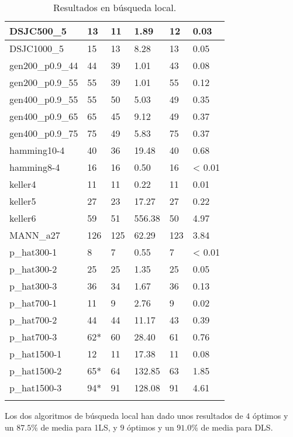 \begin{small}
\begin{longtable}{l l l l l l}
    DSJC500\_5         & 13 & 11 & 1.89 & 12 & 0.03   \\ \hline
    DSJC1000\_5        & 15 & 13 & 8.28 & 13 & 0.05   \\ \hline
    gen200\_p0.9\_44   & 44 & 39 & 1.01 & 43 & 0.08   \\ \hline
    gen200\_p0.9\_55   & 55 & 39 & 1.01 & 55 & 0.12   \\ \hline
    gen400\_p0.9\_55   & 55 & 50 & 5.03 & 49 & 0.35   \\ \hline
    gen400\_p0.9\_65   & 65 & 45 & 9.12 & 49 & 0.37   \\ \hline
    gen400\_p0.9\_75   & 75 & 49 & 5.83 & 75 & 0.37   \\ \hline
    hamming10-4        & 40 & 36 & 19.48 & 40 & 0.68   \\ \hline
    hamming8-4         & 16 & 16 & 0.50 & 16 & < 0.01   \\ \hline
    keller4            & 11 & 11 & 0.22 & 11 & 0.01  \\ \hline
    keller5            & 27 & 23 & 17.27 & 27 & 0.22   \\ \hline
    keller6            & 59 & 51 & 556.38 & 50 & 4.97   \\ \hline
    MANN\_a27          & 126 & 125 & 62.29 & 123 & 3.84   \\ \hline
    p\_hat300-1        & 8 & 7 & 0.55 & 7 & < 0.01   \\ \hline
    p\_hat300-2        & 25 & 25 & 1.35 & 25 & 0.05   \\ \hline
    p\_hat300-3        & 36 & 34 & 1.67 & 36 & 0.13  \\ \hline
    p\_hat700-1        & 11 & 9 & 2.76 & 9 & 0.02   \\ \hline
    p\_hat700-2        & 44 & 44 & 11.17 & 43 & 0.39   \\ \hline
    p\_hat700-3        & 62* & 60 & 28.40 & 61 & 0.76  \\ \hline
    p\_hat1500-1       & 12 & 11 & 17.38 & 11 & 0.08   \\ \hline
    p\_hat1500-2       & 65* & 64 & 132.85 & 63 & 1.85   \\ \hline
    p\_hat1500-3       & 94* & 91 & 128.08 & 91 & 4.61   \\ \hline
  \caption{Resultados en búsqueda local.}
\end{longtable}
\end{small}

Los dos algoritmos de búsqueda local han dado unos resultados de $4$ óptimos y
un $87.5\%$ de media para 1LS, y $9$ óptimos y un $91.0\%$ de media para DLS.

